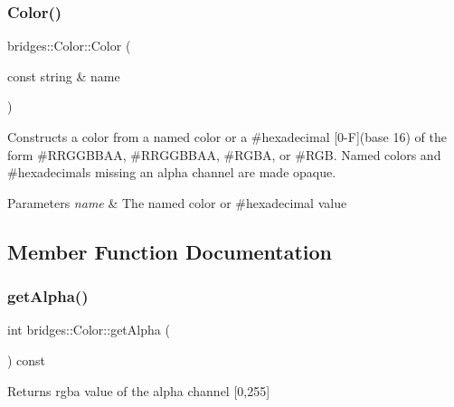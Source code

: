 \subsubsection{\texorpdfstring{Color()}{Color()}\hspace{0.1cm}{\footnotesize\ttfamily [3/3]}}
{\footnotesize\ttfamily bridges\+::\+Color\+::\+Color (\begin{DoxyParamCaption}\item[{const string \&}]{name }\end{DoxyParamCaption})\hspace{0.3cm}{\ttfamily [inline]}}

Constructs a color from a named color or a \#hexadecimal \mbox{[}0-\/F\mbox{]}(base 16) of the form \#\+R\+R\+G\+G\+B\+B\+AA, \#\+R\+R\+G\+G\+B\+B\+AA, \#\+R\+G\+BA, or \#\+R\+GB. Named colors and \#hexadecimals missing an alpha channel are made opaque.


\begin{DoxyParams}{Parameters}
{\em name} & The named color or \#hexadecimal value \\
\hline
\end{DoxyParams}


\subsection{Member Function Documentation}
\mbox{\label{classbridges_1_1_color_a61523716f5597013d57bc98eae1fe96a}} 
\subsubsection{\texorpdfstring{getAlpha()}{getAlpha()}}
{\footnotesize\ttfamily int bridges\+::\+Color\+::get\+Alpha (\begin{DoxyParamCaption}{ }\end{DoxyParamCaption}) const\hspace{0.3cm}{\ttfamily [inline]}}

\begin{DoxyReturn}{Returns}
rgba value of the alpha channel \mbox{[}0,255\mbox{]} 
\end{DoxyReturn}
\mbox{\label{classbridges_1_1_color_aa7a70279f41f2cceb640162c43a2a382}} 
